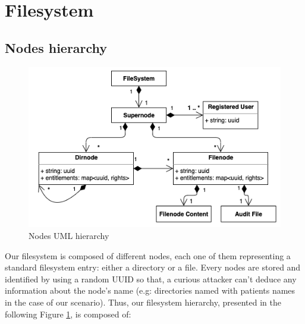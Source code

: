 \documentclass[../main.tex]{subfiles}
\begin{document}
\section{Filesystem}
\label{section:lauxus:filesystem}

\subsection{Nodes hierarchy}
\label{section:lauxus:filesystem_nodes}

\begin{figure}[ht]
    \centering
    \includegraphics[width=.75\textwidth]{../../images/lauxus/node_hierarchy}
    
    \caption{Nodes UML hierarchy}
    \label{figure:lauxus:nodes_hierarchy}
\end{figure}
\par Our filesystem is composed of different nodes, each one of them representing a standard filesystem entry: either a directory or a file. Every nodes are stored and identified by using a random UUID so that, a curious attacker can't deduce any information about the node's name (e.g: directories named with patients names in the case of our scenario). Thus, our filesystem hierarchy, presented in the following Figure \ref{figure:lauxus:nodes_hierarchy}, is composed of:
\end{document}
